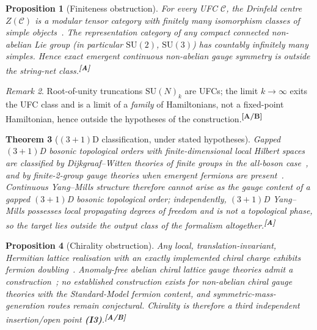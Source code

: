 \documentclass[12pt,a4paper,twoside]{article}
\theoremstyle{plain}
\newtheorem{theorem}{Theorem}[section]
\newtheorem{proposition}[theorem]{Proposition}
\theoremstyle{definition}
\theoremstyle{remark}
\newtheorem{remark}[theorem]{Remark}
\newcommand{\catmark}[1]{\textsuperscript{\textsf{\textbf{[#1]}}}}
\begin{document}
\begin{proposition}[Finiteness obstruction]
\label{prop:ufc-finiteness}
For every UFC $\mathcal{C}$, the Drinfeld centre $Z(\mathcal{C})$ is a
modular tensor category with finitely many isomorphism classes of simple
objects~\cite{mueger2003,eno2005}. The representation category of any
compact connected non-abelian Lie group (in particular $\mathrm{SU}(2)$,
$\mathrm{SU}(3)$) has countably infinitely many simples. Hence exact
emergent continuous non-abelian gauge symmetry is outside the string-net
class.\catmark{A}
\end{proposition}

\begin{remark}
Root-of-unity truncations $\mathrm{SU}(N)_k$ are UFCs; the limit
$k\to\infty$ exits the UFC class and is a limit of a \emph{family} of
Hamiltonians, not a fixed-point Hamiltonian, hence outside the hypotheses of
the construction.\catmark{A/B}
\end{remark}

\begin{theorem}[$(3{+}1)$D classification, under stated hypotheses]
\label{thm:3p1-classification}
Gapped $(3{+}1)$D bosonic topological orders with finite-dimensional local
Hilbert spaces are classified by Dijkgraaf--Witten theories of finite groups
in the all-boson case~\cite{lankongwen2018}, and by finite-2-group gauge
theories when emergent fermions are present~\cite{lanwen2019}. Continuous
Yang--Mills structure therefore cannot arise as the gauge content of a
gapped $(3{+}1)$D bosonic topological order; independently, $(3{+}1)$D
Yang--Mills possesses local propagating degrees of freedom and is not a
topological phase, so the target lies outside the output class of the
formalism altogether.\catmark{A}
\end{theorem}

\begin{proposition}[Chirality obstruction]
\label{prop:chirality-obstruction}
Any local, translation-invariant, Hermitian lattice realisation with an
exactly implemented chiral charge exhibits fermion
doubling~\cite{nielsen1981}. Anomaly-free \emph{abelian} chiral lattice
gauge theories admit a construction~\cite{luscher1999}; no established
construction exists for non-abelian chiral gauge theories with the
Standard-Model fermion content, and symmetric-mass-generation routes remain
conjectural. Chirality is therefore a third independent insertion/open point
\textbf{(I3)}.\catmark{A/B}
\end{proposition}
\end{document}
